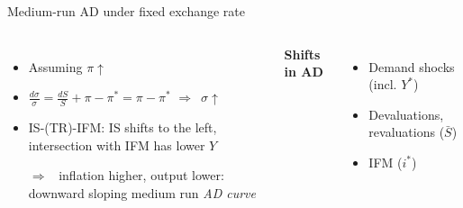 \documentclass{beamer}
\newcommand{\rarr}{$\Rightarrow$\ }
\begin{document}
\begin{frame}{Medium-run AD under fixed exchange rate}
\begin{columns}
\begin{itemize}
\item Assuming $\pi\uparrow$
\item $\frac{d \sigma}{\sigma} = \frac{d S}{S} + \pi  - \pi^* = \pi - \pi^*$ \rarr $\sigma\uparrow$
\item IS-(TR)-IFM: IS shifts to the left, intersection with IFM has lower $Y$
\item[\rarr] inflation higher, output lower: downward sloping medium run \emph{AD curve}
\end{itemize}
\textbf{Shifts in AD}
\begin{itemize}
  \item Demand shocks (incl. $Y^*$)
  \item Devaluations, revaluations ($\bar S$)
  \item IFM ($i^*$) 
\end{itemize}


\end{columns}
\end{frame}
\end{document}
